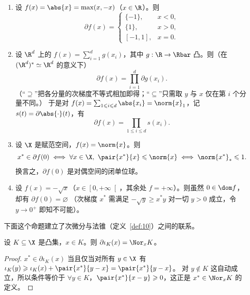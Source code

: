 \begin{example}
\label{exa:15}
\leavevmode
\begin{enumerate}[label=(\roman*)]
  \item 设 $f(x)=\abs{x}=\max(x,-x)$（$x\in\R$）。则
        \[
          \partial f(x)=\begin{cases}\{-1\}, & x<0,\\ \{1\}, & x>0,\\ [-1,1], & x=0.\end{cases}
        \]
  \item 设 $\R^d$ 上的 $f(x)=\sum_{i=1}^dg(x_i)$，其中 $g:\R\to\Rbar$ 凸。则（在 $(\R^d)^*\simeq\R^d$ 的意义下）
        \[
          \partial f(x)=\prod_{i=1}^d\partial g(x_i).
        \]
        （“$\supseteq$”把各分量的次梯度不等式相加即得；“$\subseteq$”只需取 $y$ 与 $x$ 仅在第 $i$ 个分量不同。）
        于是对 $f(x)=\sum_{1\leqslant i\leqslant d}\abs{x_i}=\norm{x}_1$，记 $s(t)=\partial\abs{\cdot}(t)$，有
        \[
          \partial f(x)=\prod_{1\leqslant i\leqslant d}s(x_i).
        \]
  \item 设 $\X$ 是赋范空间，$f(x)=\norm{x}$。则
        \[
          x^*\in\partial f(0)\iff\forall x\in\X,\ \pair{x^*}{x}\leqslant\norm{x}\iff\norm{x^*}_*\leqslant1 .
        \]
        换言之，$\partial f(0)$ 是对偶空间的闭单位球。
  \item 设 $f(x)=-\sqrt x$（$x\in\left[0,+\infty\right[$，其余处 $f=+\infty$）。则虽然 $0\in\dom f$，却有 $\partial f(0)=\varnothing$
        （次梯度 $x^*$ 需满足 $-\sqrt y\geqslant x^*y$ 对一切 $y>0$ 成立，令 $y\to0^+$ 即知不可能）。
\end{enumerate}
\end{example}

下面这个命题建立了次微分与法锥（定义~\ref{def:10}）之间的联系。

\begin{proposition}[示性函数的次微分]
\label{res:36}
设 $K\subseteq\X$ 是凸集，$x\in K$。则 $\partial\iota_K(x)=\Nor_xK$。
\end{proposition}

\begin{proof}
$x^*\in\partial\iota_K(x)$ 当且仅当对所有 $y\in\X$ 有 $\iota_K(y)\geqslant\iota_K(x)+\pair{x^*}{y-x}=\pair{x^*}{y-x}$。
对 $y\notin K$ 这自动成立，所以条件等价于 $\forall y\in K$，$\pair{x^*}{x-y}\geqslant0$，这正是 $x^*\in\Nor_xK$ 的定义。
\end{proof}


